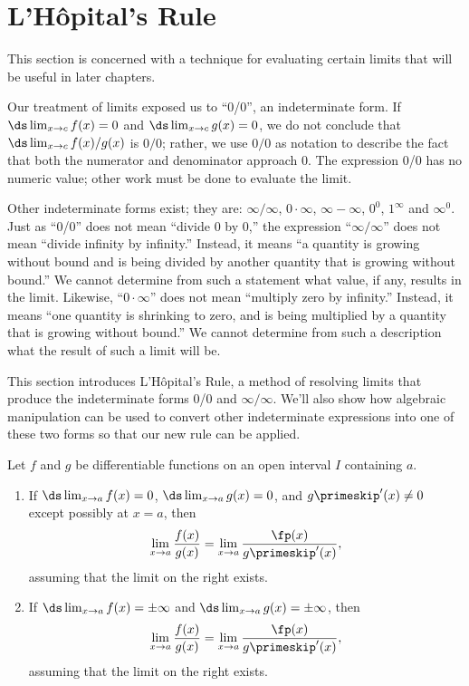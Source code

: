 \section{L'H\^opital's Rule}\label{sec:lhopitals_rule}

This section is concerned with a technique for evaluating certain limits that will be useful in later chapters.

Our treatment of limits exposed us to ``0/0'', an indeterminate form. If $\ds \lim_{x\to c}f(x)=0$ and $\ds \lim_{x\to c} g(x) =0$, we do not conclude that $\ds \lim_{x\to c} f(x)/g(x)$ is $0/0$; rather, we use $0/0$ as notation to describe the fact that both the numerator and denominator approach 0. The expression 0/0 has no numeric value; other work must be done to evaluate the limit.

Other indeterminate forms exist; they are: $\infty/\infty$, $0\cdot\infty$, $\infty-\infty$, $0^0$, $1^\infty$ and $\infty^0$. Just as ``0/0'' does not mean ``divide 0 by 0,'' the expression ``$\infty/\infty$'' does not mean ``divide infinity by infinity.'' Instead, it means ``a quantity is growing without bound and is being divided by another quantity that is growing without bound.'' We cannot determine from such a statement what value, if any, results in the limit. Likewise, ``$0\cdot \infty$'' does not mean ``multiply zero by infinity.'' Instead, it means ``one quantity is shrinking to zero, and is being multiplied by a quantity that is growing without bound.'' We cannot determine from such a description what the result of such a limit will be.

This section introduces L'H\^opital's Rule, a method of resolving limits that produce the indeterminate forms 0/0 and $\infty/\infty$. We'll also show how algebraic manipulation can be used to convert other indeterminate expressions into one of these two forms so that our new rule can be applied.

{Let $f$ and $g$ be differentiable functions on an open interval $I$ containing $a$.
\begin{enumerate}
\item If $\ds\lim_{x\to a}f(x)=0$, $\ds\lim_{x\to a}g(x)=0$, and $g\primeskip'(x)\neq 0$ except possibly at $x=a$, then \[\lim_{x\to a}\frac{f(x)}{g(x)}=\lim_{x\to a} \frac{\fp(x)}{g\primeskip'(x)},\]
assuming that the limit on the right exists.
\item If  $\ds\lim_{x\to a}f(x)=\pm\infty$ and $\ds\lim_{x\to a}g(x)=\pm\infty$, then \[\lim_{x\to a}\frac{f(x)}{g(x)}=\lim_{x\to a} \frac{\fp(x)}{g\primeskip'(x)},\]
assuming that the limit on the right exists.
\end{enumerate}}

